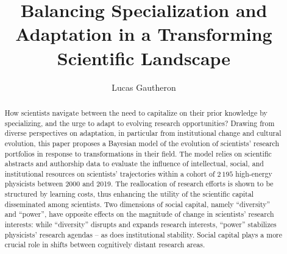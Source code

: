 \documentclass{article}
\title{Balancing Specialization and Adaptation in a Transforming Scientific Landscape}
\author{Lucas Gautheron\protect\affmark[1,2]}
\date{}
\begin{document}
\maketitle




\begin{abstract}
    How scientists navigate between the need to capitalize on their prior knowledge by specializing, and the urge to adapt to evolving research opportunities? Drawing from diverse perspectives on adaptation, in particular from institutional change and cultural evolution, this paper proposes a Bayesian model of the evolution of scientists' research portfolios in response to transformations in their field. The model relies on scientific abstracts and authorship data to evaluate the influence of intellectual, social, and institutional resources on scientists' trajectories within a cohort of $2\,195$ high-energy physicists between 2000 and 2019. The reallocation of research efforts is shown to be structured by learning costs, thus enhancing the utility of the scientific capital disseminated among scientists. Two dimensions of social capital, namely ``diversity'' and ``power'', have opposite effects on the magnitude of change in scientists' research interests: while ``diversity'' disrupts and expands research interests, ``power'' stabilizes physicists' research agendas -- as does institutional stability. Social capital plays a more crucial role in shifts between cognitively distant research areas. %
    
\end{abstract}
\end{document}
